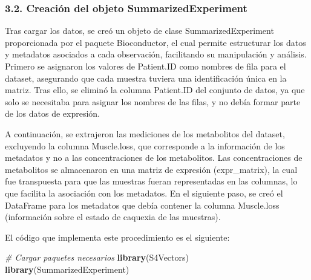 \documentclass[
]{article}
\newenvironment{Shaded}{\begin{snugshade}}{\end{snugshade}}
\newcommand{\CommentTok}[1]{\textcolor[rgb]{0.56,0.35,0.01}{\textit{#1}}}
\newcommand{\FunctionTok}[1]{\textcolor[rgb]{0.13,0.29,0.53}{\textbf{#1}}}
\newcommand{\NormalTok}[1]{#1}
\begin{document}
\subsubsection{3.2. Creación del objeto
SummarizedExperiment}\label{creaciuxf3n-del-objeto-summarizedexperiment}

Tras cargar los datos, se creó un objeto de clase SummarizedExperiment
proporcionada por el paquete Bioconductor, el cual permite estructurar
los datos y metadatos asociados a cada observación, facilitando su
manipulación y análisis. Primero se asignaron los valores de Patient.ID
como nombres de fila para el dataset, asegurando que cada muestra
tuviera una identificación única en la matriz. Tras ello, se eliminó la
columna Patient.ID del conjunto de datos, ya que solo se necesitaba para
asignar los nombres de las filas, y no debía formar parte de los datos
de expresión.

A continuación, se extrajeron las mediciones de los metabolitos del
dataset, excluyendo la columna Muscle.loss, que corresponde a la
información de los metadatos y no a las concentraciones de los
metabolitos. Las concentraciones de metabolitos se almacenaron en una
matriz de expresión (expr\_matrix), la cual fue transpuesta para que las
muestras fueran representadas en las columnas, lo que facilita la
asociación con los metadatos. En el siguiente paso, se creó el DataFrame
para los metadatos que debía contener la columna Muscle.loss
(información sobre el estado de caquexia de las muestras).

El código que implementa este procedimiento es el siguiente:

\begin{Shaded}
\begin{Highlighting}[]
\CommentTok{\# Cargar paquetes necesarios}
\FunctionTok{library}\NormalTok{(S4Vectors)}
\FunctionTok{library}\NormalTok{(SummarizedExperiment)}
\end{Highlighting}
\end{Shaded}
\end{document}
